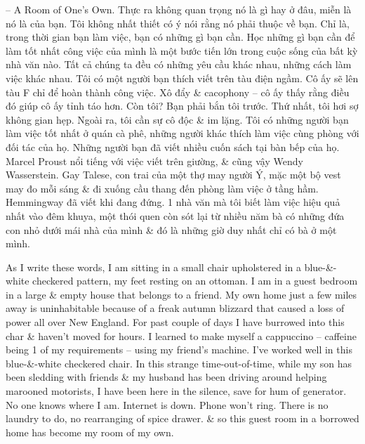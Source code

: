 \documentclass{article}
\begin{document}
\begin{itemize}
	-- {\sf A Room of One's Own.} Thực ra không quan trọng nó là gì hay ở đâu, miễn là nó là của bạn. Tôi không nhất thiết có ý nói rằng nó phải thuộc về bạn. Chỉ là, trong thời gian bạn làm việc, bạn có những gì bạn cần. Học những gì bạn cần để làm tốt nhất công việc của mình là một bước tiến lớn trong cuộc sống của bất kỳ nhà văn nào. Tất cả chúng ta đều có những yêu cầu khác nhau, những cách làm việc khác nhau. Tôi có một người bạn thích viết trên tàu điện ngầm. Cô ấy sẽ lên tàu F chỉ để hoàn thành công việc. Xô đẩy \& cacophony -- cô ấy thấy rằng điều đó giúp cô ấy tỉnh táo hơn. Còn tôi? Bạn phải bắn tôi trước. Thứ nhất, tôi hơi sợ không gian hẹp. Ngoài ra, tôi cần sự cô độc \& im lặng. Tôi có những người bạn làm việc tốt nhất ở quán cà phê, những người khác thích làm việc cùng phòng với đối tác của họ. Những người bạn đã viết nhiều cuốn sách tại bàn bếp của họ. {\sc Marcel Proust} nổi tiếng với việc viết trên giường, \& cũng vậy {\sc Wendy Wasserstein}. {\sc Gay Talese}, con trai của một thợ may người Ý, mặc một bộ vest may đo mỗi sáng \& đi xuống cầu thang đến phòng làm việc ở tầng hầm. {\sc Hemmingway} đã viết khi đang đứng. 1 nhà văn mà tôi biết làm việc hiệu quả nhất vào đêm khuya, một thói quen còn sót lại từ nhiều năm bà có những đứa con nhỏ dưới mái nhà của mình \& đó là những giờ duy nhất chỉ có bà ở một mình.
	
	As I write these words, I am sitting in a small chair upholstered in a blue-\&-white checkered pattern, my feet resting on an ottoman. I am in a guest bedroom in a large \& empty house that belongs to a friend. My own home just a few miles away is uninhabitable because of a freak autumn blizzard that caused a loss of power all over New England. For past couple of days I have burrowed into this char \& haven't moved for hours. I learned to make myself a cappuccino -- caffeine being 1 of my requirements -- using my friend's machine. I've worked well in this blue-\&-white checkered chair. In this strange time-out-of-time, while my son has been sledding with friends \& my husband has been driving around helping marooned motorists, I have been here in the silence, save for hum of generator. No one knows where I am. Internet is down. Phone won't ring. There is no laundry to do, no rearranging of spice drawer. \& so this guest room in a borrowed home has become my room of my own.
	

\end{itemize}
\end{document}
